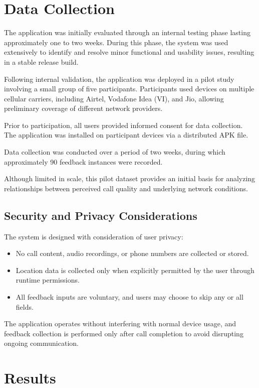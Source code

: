 \documentclass{article}
\theoremstyle{plain}
\theoremstyle{definition}
\theoremstyle{remark}
\begin{document}
\section{Data Collection}

The application was initially evaluated through an internal testing phase lasting approximately one to two weeks. During this phase, the system was used extensively to identify and resolve minor functional and usability issues, resulting in a stable release build.

Following internal validation, the application was deployed in a pilot study involving a small group of five participants. Participants used devices on multiple cellular carriers, including Airtel, Vodafone Idea (VI), and Jio, allowing preliminary coverage of different network providers.

Prior to participation, all users provided informed consent for data collection. The application was installed on participant devices via a distributed APK file.

Data collection was conducted over a period of two weeks, during which approximately 90 feedback instances were recorded. 

Although limited in scale, this pilot dataset provides an initial basis for analyzing relationships between perceived call quality and underlying network conditions.

\subsection{Security and Privacy Considerations}

The system is designed with consideration of user privacy:

\begin{itemize}
    \item No call content, audio recordings, or phone numbers are collected or stored.
    \item Location data is collected only when explicitly permitted by the user through runtime permissions.
    \item All feedback inputs are voluntary, and users may choose to skip any or all fields.
\end{itemize}

The application operates without interfering with normal device usage, and feedback collection is performed only after call completion to avoid disrupting ongoing communication.
\section{Results}
\end{document}
